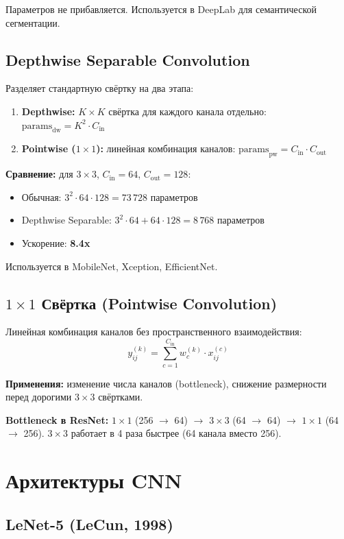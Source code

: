 \documentclass[a4paper,12pt]{article}
\begin{document}
Параметров не прибавляется. Используется в DeepLab для семантической сегментации.

\subsection{Depthwise Separable Convolution}

Разделяет стандартную свёртку на два этапа:
\begin{enumerate}
    \item \textbf{Depthwise:} $K \times K$ свёртка для каждого канала отдельно: $\text{params}_{\text{dw}} = K^2 \cdot C_{\text{in}}$
    \item \textbf{Pointwise ($1 \times 1$):} линейная комбинация каналов: $\text{params}_{\text{pw}} = C_{\text{in}} \cdot C_{\text{out}}$
\end{enumerate}

\textbf{Сравнение:} для $3\times3$, $C_{\text{in}}=64$, $C_{\text{out}}=128$:
\begin{itemize}
    \item Обычная: $3^2 \cdot 64 \cdot 128 = 73\,728$ параметров
    \item Depthwise Separable: $3^2 \cdot 64 + 64 \cdot 128 = 8\,768$ параметров
    \item Ускорение: \textbf{8.4x}
\end{itemize}

Используется в MobileNet, Xception, EfficientNet.

\subsection{$1 \times 1$ Свёртка (Pointwise Convolution)}

Линейная комбинация каналов без пространственного взаимодействия:
\[
y_{ij}^{(k)} = \sum_{c=1}^{C_{\text{in}}} w_c^{(k)} \cdot x_{ij}^{(c)}
\]

\textbf{Применения:} изменение числа каналов (bottleneck), снижение размерности перед дорогими $3\times3$ свёртками.

\textbf{Bottleneck в ResNet:} $1\times1$ (256 $\to$ 64) $\to$ $3\times3$ (64 $\to$ 64) $\to$ $1\times1$ (64 $\to$ 256). $3\times3$ работает в 4 раза быстрее (64 канала вместо 256).

\section{Архитектуры CNN}

\subsection{LeNet-5 (LeCun, 1998)}
\end{document}
